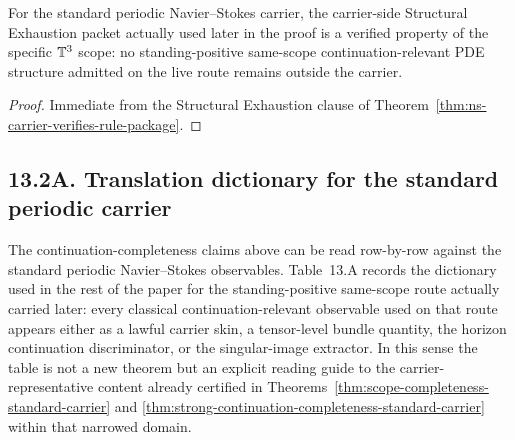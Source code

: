 \begin{corollary}
\label{cor:structural-exhaustion-verified-standard-carrier}
For the standard periodic Navier--Stokes carrier, the carrier-side Structural Exhaustion packet actually used later in the proof is a verified property of the specific $\mathbb{T}^3$ scope: no standing-positive same-scope continuation-relevant PDE structure admitted on the live route remains outside the carrier.
\end{corollary}

\begin{proof}
Immediate from the Structural Exhaustion clause of
Theorem~\ref{thm:ns-carrier-verifies-rule-package}.
\end{proof}



\subsection*{13.2A. Translation dictionary for the standard periodic carrier}

The continuation-completeness claims above can be read row-by-row against the standard periodic
Navier--Stokes observables. Table~13.A records the dictionary used in the rest of the paper for the
standing-positive same-scope route actually carried later: every classical continuation-relevant
observable used on that route appears either as a lawful carrier skin, a tensor-level bundle
quantity, the horizon continuation discriminator, or the singular-image extractor. In this sense the
table is not a new theorem but an explicit reading guide to the carrier-representative content
already certified in Theorems~\ref{thm:scope-completeness-standard-carrier} and
\ref{thm:strong-continuation-completeness-standard-carrier} within that narrowed domain.


